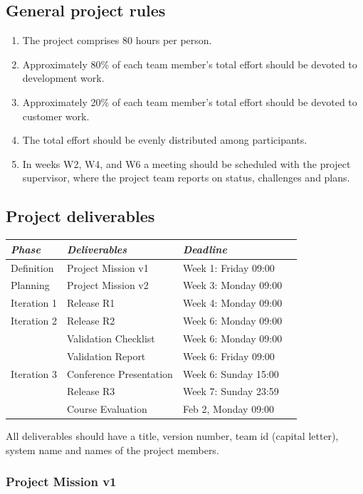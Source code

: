 \documentclass[10pt,a4paper]{article}
\begin{document}
\subsection{General project rules}
\begin{enumerate}[noitemsep]
\item The project comprises 80 hours per person.
\item Approximately 80\% of each team member's total effort should be devoted to development work.
\item Approximately 20\% of each team member's total effort should be devoted to customer work.
\item The total effort should be evenly distributed among participants.
\item In weeks W2, W4, and W6 a meeting should be scheduled with the project supervisor, where the project team reports on status, challenges and plans. 
\end{enumerate}

\subsection{Project deliverables}
\begin{tabular}{l |l p{5cm}  l}
{\it Phase} & {\it Deliverables} & {\it Deadline} \\
\hline
Definition & Project Mission v1& Week 1: Friday 09:00\\
Planning & Project Mission v2& Week 3: Monday 09:00\\
Iteration 1 & Release R1 & Week 4: Monday 09:00 \\
Iteration 2 & Release R2  & Week 6: Monday 09:00\\
   & Validation Checklist & Week 6: Monday 09:00\\
   & Validation Report & Week 6: Friday 09:00\\
Iteration 3 & Conference Presentation & Week 6: Sunday 15:00\\
   & Release R3 & Week 7: Sunday 23:59\\
   & Course Evaluation & Feb 2, Monday 09:00  \\

\end{tabular}
\vskip3mm

\noindent All deliverables should have a title, version number, team id (capital letter), system name and names of the project members. 

\subsubsection{Project Mission v1}
\end{document}
